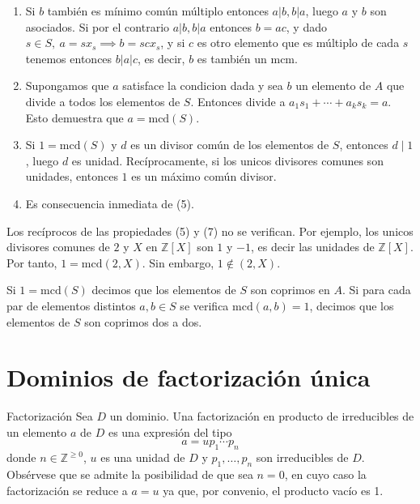 \begin{proofbox}
\begin{enumerate}
\item Si $b$ también es mínimo común múltiplo entonces $a | b, b | a$, luego $a$ y $b$ son asociados. Si por el contrario $a | b, b | a$ entonces $b = ac$, y dado $s \in S,\ a = sx_s \implies b = scx_s$, y si $c$ es otro elemento que es múltiplo de cada $s$ tenemos entonces $b | a | c$, es decir, $b$ es también un $\text{mcm}$.

\item Supongamos que \(a\) satisface la condicion dada y sea \(b\) un elemento de \(A\) que divide a todos los elementos de \(S\). Entonces divide a \(a_1 s_1 + \cdots + a_k s_k = a\). Esto demuestra que \(a = \mathrm{mcd}(S)\).

\item Si \(1 = \mathrm{mcd}(S)\) y \(d\) es un divisor común de los elementos de \(S\), entonces \(d \mid 1\), luego \(d\) es unidad. Recíprocamente, si los unicos divisores comunes son unidades, entonces \(1\) es un máximo común divisor.

\item Es consecuencia inmediata de (5).
\end{enumerate}

\end{proofbox}

\begin{example}{}{}
Los recíprocos de las propiedades (5) y (7) no se verifican. Por ejemplo, los unicos divisores comunes de \(2\) y \(X\) en \(\mathbb{Z}[X]\) son \(1\) y \(-1\), es decir las unidades de \(\mathbb{Z}[X]\). Por tanto, \(1 = \mathrm{mcd}(2,X)\). Sin embargo, \(1 \not\in (2,X)\).
\end{example}

Si \(1 = \mathrm{mcd}(S)\) decimos que los elementos de \(S\) son coprimos en \(A\). Si para cada par de elementos distintos \(a, b \in S\) se verifica \(\mathrm{mcd}(a,b) = 1\), decimos que los elementos de \(S\) son coprimos dos a dos.

\clearpage
\section{Dominios de factorización única}

\begin{definition}{Factorización}{}
Sea \(D\) un dominio. Una factorización en producto de irreducibles de un elemento \(a\) de \(D\) es una expresión del tipo
\[
a = u p_1 \cdots p_n
\]
donde \(n \in \mathbb{Z}^{\geq 0}\), \(u\) es una unidad de \(D\) y \(p_1, \ldots, p_n\) son irreducibles de \(D\). Obsérvese que se admite la posibilidad de que sea $n = 0$, en cuyo caso la factorización se reduce a $a = u$ ya que, por convenio, el producto vacío es 1.
\end{definition}

